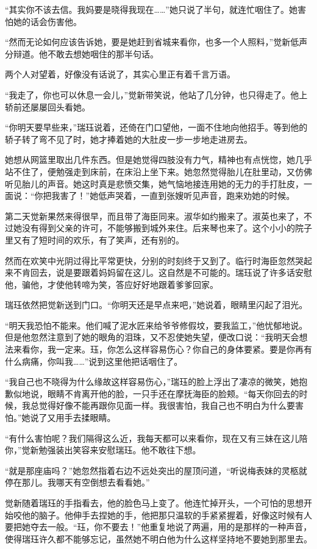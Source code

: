 \par “其实你不该去信。我妈要是晓得我现在……”她只说了半句，就连忙咽住了。她害怕她的话会伤害他。
\par “然而无论如何应该告诉她，要是她赶到省城来看你，也多一个人照料，”觉新低声分辩道。他不敢去想她咽住的那半句话。
\par 两个人对望着，好像没有话说了，其实心里正有着千言万语。
\par “我走了，你也可以休息一会儿，”觉新带笑说，他站了几分钟，也只得走了。他上轿前还屡屡回头看她。
\par “你明天要早些来，”瑞珏说着，还倚在门口望他，一面不住地向他招手。等到他的轿子转了弯不见了时，她才捧着她的大肚皮一步一步地走进房去。
\par 她想从网篮里取出几件东西。但是她觉得四肢没有力气，精神也有点恍惚，她几乎站不住了，便勉强走到床前，在床沿上坐下来。她忽然觉得胎儿在肚里动，又仿佛听见胎儿的声音。她这时真是悲愤交集，她气恼地接连用她的无力的手打肚皮，一面说：“你把我害了！”她低声哭着，一直到张嫂听见声音，跑来劝她的时候。
\par 第二天觉新果然来得很早，而且带了海臣同来。淑华如约搬来了。淑英也来了，不过她没有得到父亲的许可，不能够搬到城外来住。后来琴也来了。这个小小的院子里又有了短时间的欢乐，有了笑声，还有别的。
\par 然而在欢笑中光阴过得比平常更快，分别的时刻终于又到了。临行时海臣忽然哭起来不肯回去，说是要跟着妈妈留在这儿。这自然是不可能的。瑞珏说了许多话安慰他，骗他，才使他转啼为笑，答应好好地跟着爹爹回家。
\par 瑞珏依然把觉新送到门口。“你明天还是早点来吧，”她说着，眼睛里闪起了泪光。
\par “明天我恐怕不能来。他们喊了泥水匠来给爷爷修假坟，要我监工，”他忧郁地说。但是他忽然注意到了她的眼角的泪珠，又不忍使她失望，便改口说：“我明天会想法来看你，我一定来。珏，你怎么这样容易伤心？你自己的身体要紧。要是你再有什么病痛，你叫我……”说到这里他把话咽住了。
\par “我自己也不晓得为什么缘故这样容易伤心，”瑞珏的脸上浮出了凄凉的微笑，她抱歉似地说，眼睛不肯离开他的脸，一只手还在摩抚海臣的脸颊。“每天你回去的时候，我总觉得好像不能再跟你见面一样。我很害怕，我自己也不明白为什么要害怕。”她说了又用手去揉眼睛。
\par “有什么害怕呢？我们隔得这么近，我每天都可以来看你，现在又有三妹在这儿陪你，”觉新勉强装出笑容来安慰瑞珏。他不敢往下想。
\par “就是那座庙吗？”她忽然指着右边不远处突出的屋顶问道，“听说梅表妹的灵柩就停在那儿。我哪天有空倒想去看看她。”
\par 觉新随着瑞珏的手指看去，他的脸色马上变了。他连忙掉开头，一个可怕的思想开始咬他的脑子。他伸手去捏她的手，他把那只温软的手紧紧握着，好像这时候有人要把她夺去一般。“珏，你不要去！”他重复地说了两遍，用的是那样的一种声音，使得瑞珏许久都不能够忘记，虽然她不明白他为什么这样坚持地不要她到那里去。
